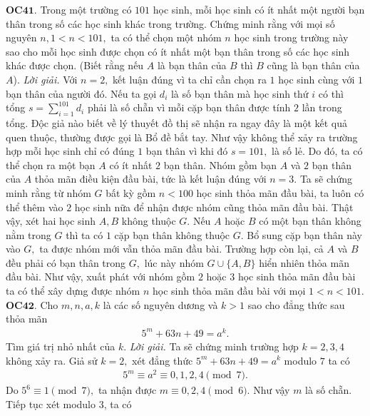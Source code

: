 \begin{multicols}{2}
	{\bf\color{cackithi} OC$\pmb{41.}$} Trong một trường có $101$ học sinh, mỗi học sinh có ít nhất một người bạn thân trong số các học sinh khác trong trường. Chứng minh rằng với mọi số nguyên $n, 1<n<101,$ ta có thể chọn một nhóm $n$ học sinh trong trường này sao cho mỗi học sinh được chọn có ít nhất một bạn thân trong số các học sinh khác được chọn. (Biết rằng nếu  $A$ là bạn thân của $B$ thì $B$ cũng là bạn thân của $A$).
	\vskip 0.1cm
	\textit{Lời giải.}
	Với $n=2,$ kết luận đúng vì ta chỉ cần chọn ra $1$ học sinh cùng với $1$ bạn thân của người đó.
	\vskip 0.1cm
	Nếu ta gọi $d_i$ là số bạn thân mà học sinh thứ $i$ có thì tổng $s=\sum_{i=1}^{101} d_i$ phải là số chẵn vì mỗi cặp bạn thân được tính $2$ lần trong tổng. Độc giả nào biết về lý thuyết đồ thị sẽ nhận ra ngay đây là một kết quả quen thuộc, thường được gọi là Bổ đề bắt tay. Như vậy không thể xảy ra trường hợp mỗi học sinh chỉ có đúng $1$ bạn thân vì khi đó $s=101,$ là số lẻ. Do đó, ta có thể chọn ra một bạn $A$ có ít nhất $2$ bạn thân. Nhóm gồm bạn $A$ và $2$ bạn thân của $A$ thỏa mãn điều kiện đầu bài, tức là kết luận đúng với $n=3$.
	\vskip 0.1cm
	Ta sẽ chứng minh rằng từ nhóm $G$ bất kỳ gồm $n<100$ học sinh thỏa mãn đầu bài, ta luôn có thể thêm vào $2$ học sinh nữa để nhận được nhóm cũng thỏa mãn đầu bài. Thật vậy, xét hai học sinh $A, B$ không thuộc $G.$ Nếu $A$ hoặc $B$ có một bạn thân không nằm trong $G$ thì ta có $1$ cặp bạn thân không thuộc $G.$ Bổ sung cặp bạn thân này vào $G,$ ta được nhóm mới vẫn thỏa mãn đầu bài. Trường hợp còn lại, cả $A$ và $B$ đều phải có bạn thân trong $G,$ lúc này nhóm $G\cup \{A, B\}$ hiển nhiên thỏa mãn đầu bài.
	\vskip 0.1cm
	Như vậy, xuất phát với nhóm gồm $2$ hoặc $3$ học sinh thỏa mãn đầu bài ta có thể xây dựng được nhóm $n$ học sinh thỏa mãn đầu bài với mọi $1<n<101.$    
	\vskip 0.1cm
	{\bf\color{cackithi} OC$\pmb{42.}$} Cho $m, n, a, k$ là các số nguyên dương và $k>1$ sao cho đẳng thức sau thỏa mãn
	\begin{align*}
		5^m+63n+49=a^k.
	\end{align*}
	Tìm giá trị nhỏ nhất của $k$.
	\vskip 0.1cm
	\textit{Lời giải.} Ta sẽ chứng minh trường hợp $k=2, 3, 4$ không xảy ra.
	\vskip 0.1cm
	Giả sử $k=2,$ xét đẳng thức $5^m+63n+49=a^k$ modulo $7$ ta có 
	\begin{align*}
		5^m \equiv a^2 \equiv 0,1,2,4 \pmod{7}.
	\end{align*}
	Do $5^6\equiv 1 \pmod{7},$  ta nhận được $m \equiv 0,2,4 \pmod{6}.$ 
	\vskip 0.1cm
	Như vậy $m$ là số chẵn. Tiếp tục xét modulo $3$, ta có
	\begin{align*}

\end{align*}
\end{multicols}
